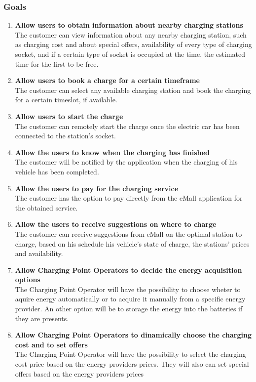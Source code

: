 \subsubsection{Goals}
\begin{enumerate}[label=$\bullet$ \textbf{G\arabic*:}]
        \item \textbf{Allow users to obtain information about nearby charging stations}
        \\
        The customer can view information about any nearby charging station,  
        such as charging cost and about special offers, availability of every type of charging socket, 
        and if a certain type of socket is occupied at the time,
         the estimated time for the first to be free.
        \item \textbf{Allow users to book a charge for a certain timeframe}
        \\
        The customer can select any available charging station and book the charging for a certain timeslot, if available. 
        \item \textbf{Allow users to start the charge}
        \\
        The customer can remotely start the charge once the electric car has been connected to the station's socket.
        \item \textbf{Allow the users to know when the charging has finished}
        \\
        The customer will be notified by the application when the charging of his vehicle has been completed.
        \item \textbf{Allow the users to pay for the charging service}
        \\
        The customer has the option to pay directly from the eMall application for the obtained service.
        \item \textbf{Allow the users to receive suggestions on where to charge}
        \\
        The customer can receive suggestions from eMall on the optimal station to charge, based on his schedule his vehicle's state of charge, the stations' prices and availability.
        
        \item \textbf{Allow Charging Point Operators to decide the energy acquisition options}
        \\
        The Charging Point Operator will have the possibility to choose wheter to aquire energy automatically or to acquire it manually from a specific energy provider.
        An other option will be to storage the energy into the batteries if they are presents.
        \item \textbf{Allow Charging Point Operators to dinamically choose the charging cost and to set offers}
        \\
        The Charging Point Operator will have the possibility to select the charging cost price based on the energy providers prices. They will also can set special offers based on the energy providers prices
\end{enumerate}


